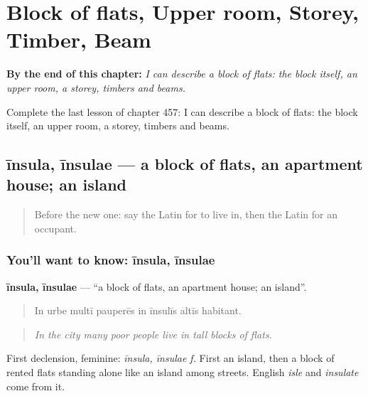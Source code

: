 
\chapter{Block of flats, Upper room, Storey, Timber, Beam}
\label{ch:la-block-of-flats-upper-room-storey-timber-beam}

\begin{chapteropening}
\textbf{By the end of this chapter:} \emph{I can describe a block of flats: the block itself, an upper room, a storey, timbers and beams.}

Complete the last lesson of chapter 457: I can describe a block of flats: the block itself, an upper room, a storey, timbers and beams.
\end{chapteropening}

\section[īnsula, īnsulae]{īnsula, īnsulae — a block of flats, an apartment house; an island}

\label{lesson:LA-C457-insula}



\begin{quote}
Before the new one: say the Latin for to live in, then the Latin for an occupant.
\end{quote}

\subsection*{You'll want to know: īnsula, īnsulae}
\textbf{īnsula, īnsulae} — \textquotedblleft{}a block of flats, an apartment house; an island\textquotedblright{}.

\begin{quote}
In urbe multī pauperēs in īnsulīs altīs habitant.
\end{quote}

\begin{quote}
\emph{In the city many poor people live in tall blocks of flats.}
\end{quote}

First declension, feminine: \emph{īnsula, īnsulae f.} First an island, then a block of rented flats standing alone like an island among streets. English \emph{isle} and \emph{insulate} come from it.

